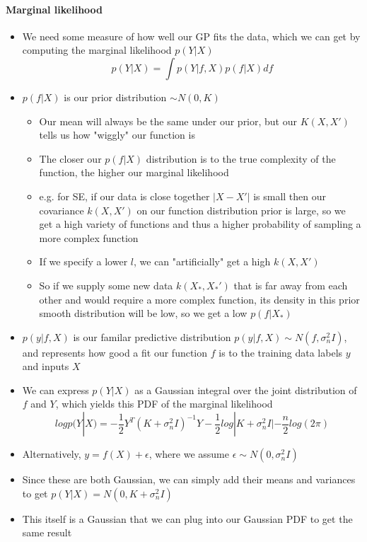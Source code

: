 \documentclass[12pt]{article}
\begin{document}
\paragraph{Marginal likelihood}
\begin{itemize}
    \item We need some measure of how well our GP fits the data, which we can get by computing the marginal likelihood $p(Y|X)$
\begin{equation}
    p(Y|X) = \int p(Y|f,X)p(f|X) df
\end{equation}
    \item $p(f|X)$ is our prior distribution $\sim N(0, K)$
    \begin{itemize}
        \item Our mean will always be the same under our prior, but our $K(X,X')$ tells us how "wiggly" our function is
        \item The closer our $p(f|X)$ distribution is to the true complexity of the function, the higher our marginal likelihood
        \item e.g. for SE, if our data is close together $|X - X'|$ is small then our covariance $k(X,X')$ on our function distribution prior is large, so we get a high variety of functions and thus a higher probability of sampling a more complex function
        \item If we specify a lower $l$, we can "artificially" get a high $k(X,X')$ 
        \item So if we supply some new data $k(X_*, X_*')$ that is far away from each other and would require a more complex function, its density in this prior smooth distribution will be low, so we get a low $p(f|X_*)$
    \end{itemize}
    \item $p(y|f,X)$ is our familar predictive distribution $p(y|f,X) \sim N(f, \sigma^2_nI)$, and represents how good a fit our function $f$ is to the training data labels $y$ and inputs $X$
    \item We can express $p(Y|X)$ as a Gaussian integral over the joint distribution of $f$ and $Y$, which yields this PDF of the marginal likelihood
\begin{equation}
    log p(Y|X) = -\frac{1}{2}Y^T(K + \sigma^2_nI)^{-1}Y - \frac{1}{2}log|K + \sigma^2_nI| - \frac{n}{2}log(2\pi)
\end{equation}
    \item Alternatively, $y = f(X) + \epsilon$, where we assume $\epsilon \sim N(0, \sigma^2_nI)$
    \item Since these are both Gaussian, we can simply add their means and variances to get $p(Y|X) = N(0, K + \sigma^2_nI)$
    \item This itself is a Gaussian that we can plug into our Gaussian PDF to get the same result
\end{itemize}
\end{document}
